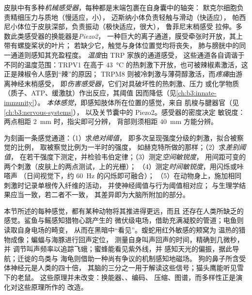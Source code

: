 \begin{definition}[体感觉]\label{def:b3:sensory-systems:somato}
皮肤中有多种\emph{机械感受器}，每种都是末端包裹在自身囊中的轴突：
默克尔细胞负责精细压力与质地（慢适应，小），
迈斯纳小体负责轻触与滑动（快适应），
帕西尼小体位于皮肤深部，负责振动（极快适应，很大），
鲁菲尼末梢感受
拉伸。多数此类感受器的换能器是\emph{Piezo2}，
一种巨大的离子通道，膜受牵张时开放，其上带有螺旋桨状的叶片；
若缺少它，触觉与身体位置觉均将丧失，
肺与膀胱中的同一通道则感知其充盈程度。
\emph{温度}由 TRP 家族的通道感受，
这些通道各自调谐于不同的温度范围：TRPV1 在高于
\qty{43}{\celsius} 的热刺激下开放，也可被辣椒素激活，这正是辣椒令人感到“辣”的原因；
TRPM8 则被冷刺激与薄荷醇激活，而\emph{疼痛}由游离神经末梢感受，
即\emph{伤害感受器}，它们对具破坏性的热刺激、压力
或化学物质（质子、ATP、缓激肽）作出反应，其阈值
因而降低（见\cref{ch:b3:innate-immunity}）。
\emph{本体感觉}，即感知肢体所在位置的感觉，来自
肌梭与腱器官（见\cref{ch:b3:nervous-systems}），
以及关节囊中的 Piezo2。感受器的密度决定
敏锐度：两点相距 \qty{2}{mm} 时，指尖即可分辨，
背部则须相距 \qty{40}{mm} 方能分辨。
\end{definition}

\begin{method}[测量感觉]\label{met:b3:sensory-systems:psychophysics}
为刻画一条感觉通道：（1）求\emph{绝对阈值}，
即多次呈现强度分级的刺激，拟合被察觉的比例，
取被察觉比例为一半时的强度，
如赫克特所做的那样；（2）求\emph{差别阈值}，
在若干强度下测定，并检验韦伯定律；（3）测定\emph{空间敏锐度}，
用间距可变的两个刺激（皮肤上的两点测试，上的光栅）；
（4）测定\emph{时间敏锐度}，用闪烁或咔嗒声
（日间视觉下，约 \qty{60}{Hz} 的闪烁即可融合）；
（5）在动物身上，施加相同刺激时记录单根传入纤维的活动，
并使神经阈值与行为阈值相对应；
与生理学结果应当一致，若二者不一致，
其差异即为大脑所附加的部分。
\end{method}

\begin{remark}\label{rem:b3:sensory-systems:others}
本节所述的每种感觉，都有某种动物将其推进得更远，而且
还存在人类所缺乏的感觉。鲨鱼与鳐感知猎物心跳产生的
微伏级电场，借助充满凝胶的管道；电鱼则读取自身电场的畸变，
从而在黑暗中“看见”。蝮蛇用红外敏感的颊窝为
温热的猎物成像；蝙蝠与海豚进行回声定位，
测量自身叫声回声的时间，精确到几微秒，并
调节叫声频率以追踪飞蛾；蜜蜂能看见紫外线，并
感知天光的偏振，据此导航；迁徙的鸟类与
海龟则借助一种尚有争议的机制感知地磁场。
狗的鼻子所含受体神经元是人类的四十倍，
其脑的三分之一用于解读这些信号；猫头鹰能听见雪下的老鼠。
这些原理并未改变：换能器、、编码、
压缩、图谱，而多样性正是演化对这些原理所作的
改造。
\end{remark}

